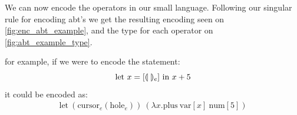 \documentclass[sigplan,review]{acmart}
\newcommand{\abt}{\textsf{abt}\xspace}
\begin{document}
\begin{example}\label{ex:enc_abt_example}
    We can now encode the operators in our small language. Following
    our singular rule for encoding {\abt}'s we get the resulting encoding
    seen on \cref{fig:enc_abt_example}, and the type for each operator
    on \cref{fig:abt_example_type}. 
    
    
    
\end{example}

for example, if we were to encode the statement:
\begin{equation*}
        \text{let $x=[\llparenthesis \ \rrparenthesis_e]$ in $x+5$}
    \end{equation*}
    it could be encoded as:
    \begin{align*} 
        \text{let} \ (\text{cursor}_e(\text{hole}_e)) \ (\lambda x . \text{plus} \ \text{var}[x] \ \text{num}[5])
  \end{align*}
\end{document}
